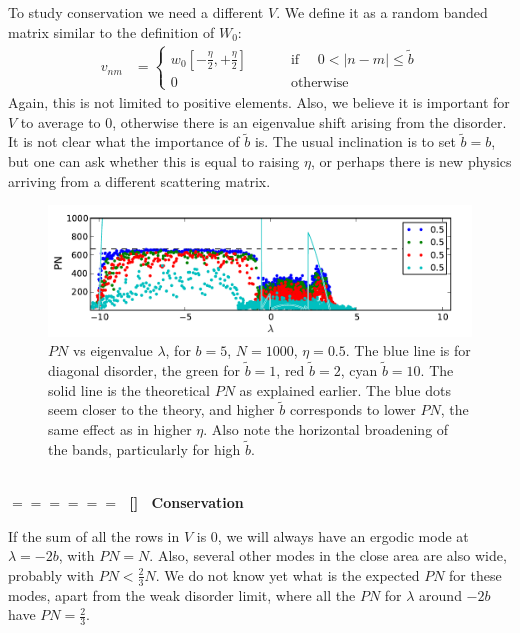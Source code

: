 \documentclass[onecolumn,fleqn,longbibliography]{revtex4}
\newcommand{\sect}[1]
{
\addtocounter{section}{1} 
\setcounter{subsection}{0}
\ \\ 
\pdfbookmark[2]{\thesection. \ #1}{sect.\thesection}
{\Large\bf $=\!=\!=\!=\!=\!=\;$ [\thesection] \ #1}  
\nopagebreak
}
\begin{document}
To study conservation we need a different $V$.
We define it as a random banded matrix similar to the definition of $W_0$:
\begin{align}
v_{nm} &= \begin{cases}
  w_0 \left[-\frac{\eta}{2},+\frac{\eta}{2} \right]&\qquad \textrm{ if  } \quad 0<|n-m|\le \tilde{b} \\
  0 &\qquad \textrm{ otherwise}
\end{cases}
\end{align}
Again, this is not limited to positive elements. Also, we believe it is 
important for $V$ to average to $0$, otherwise there is an eigenvalue shift 
arising from the disorder. It is not clear what the importance of $\tilde{b}$
is. The usual inclination is to set $\tilde{b}=b$, but one can ask
whether this is equal to raising $\eta$, or perhaps there is new
physics arriving from a different scattering matrix.
\begin{figure}[H]
    \includegraphics{pta_B_BB_pn}
    \caption{$PN$ vs eigenvalue $\lambda$, for $b=5$, $N=1000$, $\eta=0.5$. The blue line is
        for diagonal disorder, the green for $\tilde{b}=1$, red $\tilde{b}=2$, cyan $\tilde{b}=10$.
        The solid line is the theoretical $PN$ as explained earlier. The
        blue dots seem closer to the theory, and higher $\tilde{b}$ corresponds 
        to lower $PN$, the same effect as in higher $\eta$. Also note the horizontal
        broadening of the bands, particularly for high $\tilde{b}$.}
    \label{fig:BB}
\end{figure}

\sect{Conservation}

If the sum of all the rows in $V$ is $0$, we will always have an ergodic mode
at $\lambda=-2b$, with $PN=N$. Also, several other modes in the close 
area are also wide, probably with $PN< \frac{2}{3} N$. We do not know yet 
what is the expected $PN$ for these modes, apart from the weak disorder limit,
where all the $PN$ for $\lambda$ around $-2b$ have $PN=\frac{2}{3}$.
\end{document}
